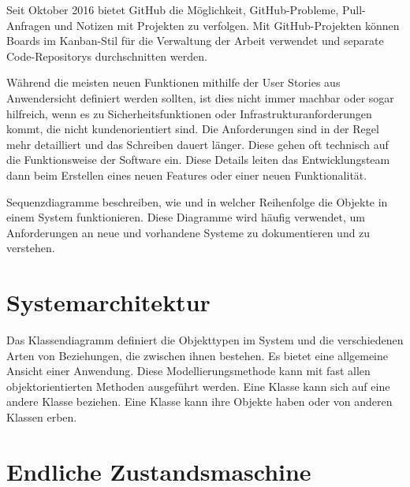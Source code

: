 Seit Oktober 2016 bietet GitHub die Möglichkeit, GitHub-Probleme, Pull-Anfragen und Notizen mit Projekten zu verfolgen. Mit GitHub-Projekten können Boards im Kanban-Stil für die Verwaltung der Arbeit verwendet und separate Code-Repositorys durchschnitten werden. 



Während die meisten neuen Funktionen mithilfe der User Stories aus Anwendersicht definiert werden sollten, ist dies nicht immer machbar oder sogar hilfreich, wenn es zu Sicherheitsfunktionen oder Infrastrukturanforderungen kommt, die nicht kundenorientiert sind. Die Anforderungen sind in der Regel mehr detailliert und das Schreiben dauert länger. Diese gehen oft technisch auf die Funktionsweise der Software ein. Diese Details leiten das Entwicklungsteam dann beim Erstellen eines neuen Features oder einer neuen Funktionalität.

Sequenzdiagramme beschreiben, wie und in welcher Reihenfolge die Objekte in einem System funktionieren. Diese Diagramme wird häufig verwendet, um Anforderungen an neue und vorhandene Systeme zu dokumentieren und zu verstehen.

\section{Systemarchitektur}
\label{sec:design:arch}
Das Klassendiagramm definiert die Objekttypen im System und die verschiedenen Arten von Beziehungen, die zwischen ihnen bestehen. Es bietet eine allgemeine Ansicht einer Anwendung. Diese Modellierungsmethode kann mit fast allen objektorientierten Methoden ausgeführt werden. Eine Klasse kann sich auf eine andere Klasse beziehen. Eine Klasse kann ihre Objekte haben oder von anderen Klassen erben.

\section{Endliche Zustandsmaschine}
\label{sec:design:fsm}
